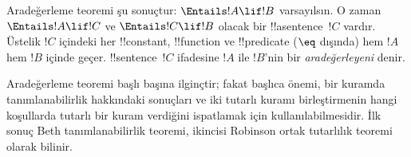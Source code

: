 



Aradeğerleme teoremi şu sonuçtur: $\Entails !A\lif !B$ varsayılsın.
O zaman $\Entails !A\lif !C$ ve $\Entails !C\lif !B$ olacak bir
!!a{sentence}~$!C$ vardır. Üstelik $!C$ içindeki her !!{constant},
!!{function} ve !!{predicate} ($\eq$ dışında) hem $!A$ hem $!B$ içinde
geçer. !!{sentence}~$!C$ ifadesine $!A$ ile $!B$'nin bir
\emph{aradeğerleyeni} denir.

Aradeğerleme teoremi başlı başına ilginçtir; fakat başlıca önemi, bir
kuramda tanımlanabilirlik hakkındaki sonuçları ve iki tutarlı kuramı
birleştirmenin hangi koşullarda tutarlı bir kuram verdiğini ispatlamak
için kullanılabilmesidir. İlk sonuç Beth tanımlanabilirlik teoremi,
ikincisi Robinson ortak tutarlılık teoremi olarak bilinir.

